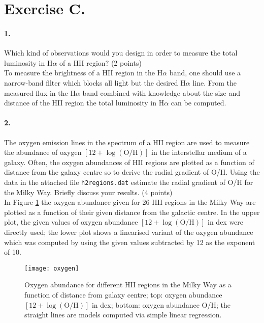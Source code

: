 \documentclass[11pt,a4paper,twoside]{article}
\begin{document}
\section*{Exercise C.}

\paragraph{1.} Which kind of observations would you design in order to measure
the total luminosity in $\text{H}\alpha$ of a HII region? (2 points) \\

To measure the brightness of a HII region in the $\text{H}\alpha$ band, one should use a narrow-band filter which blocks all light but the desired $\text{H}\alpha$ line. From the measured flux in the $\text{H}\alpha$ band combined with knowledge about the size and distance of the HII region the total luminosity in $\text{H}\alpha$ can be computed. \\

\paragraph{2.} The oxygen emission lines in the spectrum of a HII region are
used to measure the abundance of oxygen $ \left[12 + \log{\left( \text{O/H}
\right)} \right]$ in the interstellar medium of a galaxy. Often, the oxygen
abundances of HII regions are plotted as a function of distance from the galaxy
centre so to derive the radial gradient of O/H. Using the data in the attached
file \verb+h2regions.dat+ estimate the radial gradient of O/H for the Milky
Way. Briefly discuss your results. (4 points) \\

In Figure \ref{fig:oxygen} the oxygen abundance given for \num{26} HII regions
in the Milky Way are plotted as a function of their given distance from the
galactic centre. In the upper plot, the given values of oxygen abundance $
\left[12 + \log{\left( \text{O/H} \right)} \right]$ in dex were directly used;
the lower plot shows a linearised variant of the oxygen abundance which was
computed by using the given values subtracted by \num{12} as the exponent of
\num{10}. \\

\begin{figure}[h!]
\centering
\texttt{[image: oxygen]}
\caption{Oxygen abundance for different HII regions in the Milky Way as a
function of distance from galaxy centre; top: oxygen abundance $ \left[12 +
\log{\left( \text{O/H} \right)} \right]$ in dex; bottom: oxygen abundance O/H;
the straight lines are models computed via simple linear regression.}
\label{fig:oxygen}
\end{figure}
\end{document}
